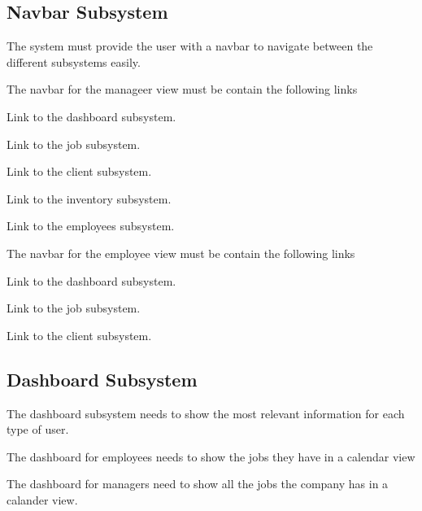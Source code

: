 \documentclass{article}
\begin{document}
	\subsection*{Navbar Subsystem}	
	\begin{list}{R.}{}
		\item The system must provide the user with a navbar to navigate between the different subsystems easily. 
		\item The navbar for the manageer view must be contain the following links
		 \begin{list}{R.}{}
		 	\item Link to the dashboard subsystem.
		 	\item Link to the job subsystem.
		 	\item Link to the client subsystem.
		 	\item Link to the inventory subsystem.
		 	\item Link to the employees subsystem.
		 \end{list} 
		\item The navbar for the employee view must be contain the following links
		\begin{list}{R.}{}
			\item Link to the dashboard subsystem.
			\item Link to the job subsystem.
			\item Link to the client subsystem.
		\end{list} 
	\end{list}
	
	
	\subsection*{Dashboard Subsystem}	
	\begin{list}{R.}{}
		\item The dashboard subsystem needs to show the most relevant information for each type of user.
		\item The dashboard for employees needs to show the jobs they have in a calendar view 
		\item The dashboard for managers need to show all the jobs the company has in a calander view.
	\end{list}
	
\end{document}
